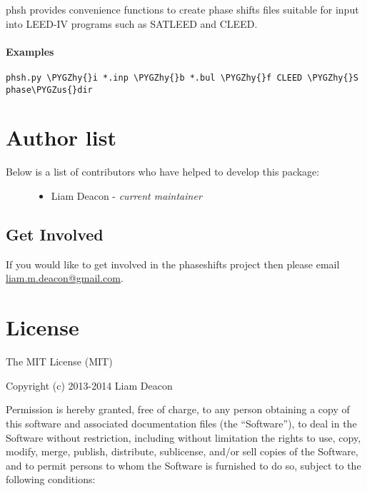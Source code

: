 \documentclass[letterpaper,10pt,english]{sphinxmanual}
\def\PYGZus{\char`\_}
\def\PYGZhy{\char`\-}
\begin{document}
phsh provides convenience functions to create phase shifts files
suitable for input into LEED-IV programs such as SATLEED and CLEED.


\subsubsection{Examples}
\label{modules:id2}
\begin{Verbatim}[commandchars=\\\{\}]
phsh.py \PYGZhy{}i *.inp \PYGZhy{}b *.bul \PYGZhy{}f CLEED \PYGZhy{}S phase\PYGZus{}dir
\end{Verbatim}


\chapter{Author list}
\label{authors:author-list}\label{authors::doc}\label{authors:authors}\begin{description}
\item[{Below is a list of contributors who have helped to develop this package:}] \leavevmode\begin{itemize}
\item {} 
Liam Deacon - \emph{current maintainer}

\end{itemize}

\end{description}


\section{Get Involved}
\label{authors:get-involved}
If you would like to get involved in the phaseshifts project then
please email \href{mailto:liam.m.deacon@gmail.com}{liam.m.deacon@gmail.com}.


\chapter{License}
\label{LICENSE::doc}\label{LICENSE:license}\label{LICENSE:id1}
The MIT License (MIT)

Copyright (c) 2013-2014 Liam Deacon

Permission is hereby granted, free of charge, to any person obtaining a copy
of this software and associated documentation files (the ``Software''), to deal
in the Software without restriction, including without limitation the rights
to use, copy, modify, merge, publish, distribute, sublicense, and/or sell
copies of the Software, and to permit persons to whom the Software is
furnished to do so, subject to the following conditions:
\end{document}
